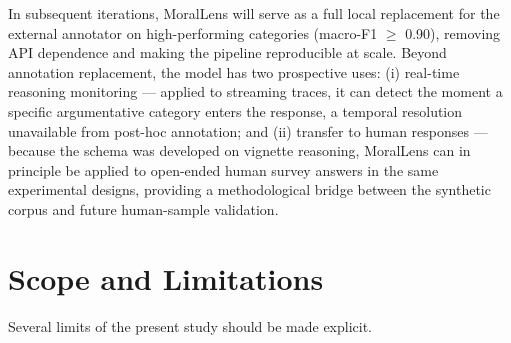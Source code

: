 \documentclass[14pt,a4paper]{extarticle}
\begin{document}
 In subsequent iterations, MoralLens will serve as a full local replacement for the external annotator on high-performing categories (macro-F1 $\geq$ 0.90), removing API dependence and making the pipeline reproducible at scale. Beyond annotation replacement, the model has two prospective uses: (i) real-time reasoning monitoring --- applied to streaming traces, it can detect the moment a specific argumentative category enters the response, a temporal resolution unavailable from post-hoc annotation; and (ii) transfer to human responses --- because the schema was developed on vignette reasoning, MoralLens can in principle be applied to open-ended human survey answers in the same experimental designs, providing a methodological bridge between the synthetic corpus and future human-sample validation.


\section{Scope and Limitations}

Several limits of the present study should be made explicit.
\end{document}
